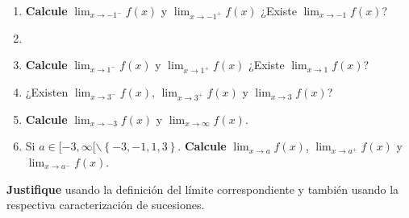 \documentclass[12pt]{article}
\begin{document}
\begin{enumerate}
\begin{enumerate}
        \item \textbf{Calcule} $\lim_{x \rightarrow-1^-}f(x)$ y $\lim_{x \rightarrow-1^+}f(x)$ ¿Existe $\lim_{x \rightarrow-1}f(x)$?
        \item \item \textbf{Calcule} $\lim_{x \rightarrow1^-}f(x)$ y $\lim_{x \rightarrow1^+}f(x)$ ¿Existe $\lim_{x \rightarrow1}f(x)$?
        \item ¿Existen $\lim_{x \rightarrow3^-}f(x)$, $\lim_{x \rightarrow3^+}f(x)$ y $\lim_{x \rightarrow3}f(x)$?
        \item \textbf{Calcule} $\lim_{x \rightarrow-3}f(x)$ y $\lim_{x \rightarrow\infty}f(x)$.
        \item Si $a\in[-3,\infty[\backslash\left\{-3,-1,1,3 \right\}$. \textbf{Calcule} $\lim_{ x\rightarrow a}f(x)$, $\lim_{ x\rightarrow a^+}f(x)$ y $\lim_{ x\rightarrow a^-}f(x)$.
    \end{enumerate}
    \textbf{Justifique} usando la definición del límite correspondiente y también usando la respectiva caracterización de sucesiones.


\end{enumerate}
\end{document}
